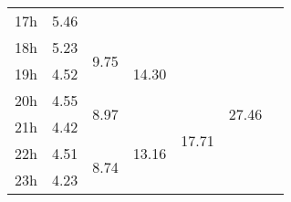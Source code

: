 \begin{center}
\begin{tabular}{l || c | c | c | c | c | c |}
17h & \multirow{1}{*}{ 5.46 }  & & & & & \\\cline{1-1}\cline{2-2}\cline{3-3}\cline{5-5}
18h & \multirow{1}{*}{ 5.23 }  & \multirow{2}{*}{ 9.75 }  & \multirow{3}{*}{ 14.30 }  & & \multirow{6}{*}{ 27.46 }  & \\\cline{1-1}
19h & \multirow{1}{*}{ 4.52 }  & & & & & \\\cline{1-1}\cline{2-2}\cline{4-4}
20h & \multirow{1}{*}{ 4.55 }  & \multirow{2}{*}{ 8.97 }  & & \multirow{4}{*}{ 17.71 }  & & \\\cline{1-1}\cline{3-3}
21h & \multirow{1}{*}{ 4.42 }  & & \multirow{3}{*}{ 13.16 }  & & & \\\cline{1-1}\cline{2-2}
22h & \multirow{1}{*}{ 4.51 }  & \multirow{2}{*}{ 8.74 }  & & & & \\\cline{1-1}
23h & \multirow{1}{*}{ 4.23 }  & & & & & \\\cline{1-1}\cline{2-2}\cline{3-3}\cline{4-4}\cline{5-5}\cline{6-6}
\end{tabular}
\end{center}